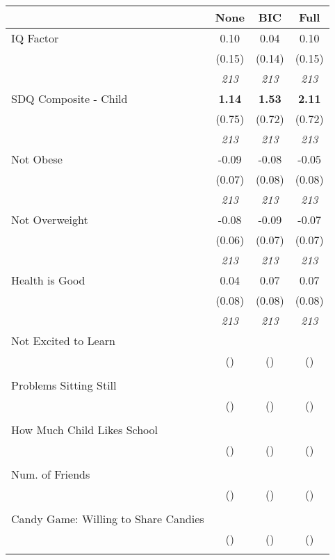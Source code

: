 \begin{tabular}{l c c c}
\toprule
 & None & BIC & Full \\
\midrule
IQ Factor & 0.10 & 0.04 & 0.10 \\
& (0.15) & (0.14) & (0.15) \\
& \textit{ 213 } & \textit{ 213 } & \textit{ 213 } \\
SDQ Composite - Child & \textbf{ 1.14 } & \textbf{ 1.53 } & \textbf{ 2.11 } \\
& (0.75) & (0.72) & (0.72) \\
& \textit{ 213 } & \textit{ 213 } & \textit{ 213 } \\
Not Obese & -0.09 & -0.08 & -0.05 \\
& (0.07) & (0.08) & (0.08) \\
& \textit{ 213 } & \textit{ 213 } & \textit{ 213 } \\
Not Overweight & -0.08 & -0.09 & -0.07 \\
& (0.06) & (0.07) & (0.07) \\
& \textit{ 213 } & \textit{ 213 } & \textit{ 213 } \\
Health is Good & 0.04 & 0.07 & 0.07 \\
& (0.08) & (0.08) & (0.08) \\
& \textit{ 213 } & \textit{ 213 } & \textit{ 213 } \\
Not Excited to Learn & & & \\
& () & () & () \\
& & & \\
Problems Sitting Still & & & \\
& () & () & () \\
& & & \\
How Much Child Likes School & & & \\
& () & () & () \\
& & & \\
Num. of Friends & & & \\
& () & () & () \\
& & & \\
Candy Game: Willing to Share Candies & & & \\
& () & () & () \\
& & & \\
\bottomrule
\end{tabular}
